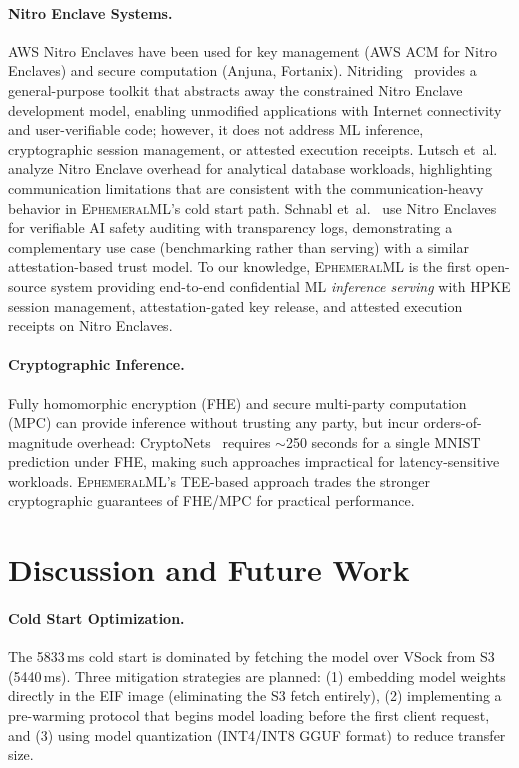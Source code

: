 \documentclass[11pt,a4paper]{article}
\newcommand{\BenchSThreeFetchMs}{5440}
\newcommand{\BenchColdStartTotalMs}{5833}
\begin{document}
\paragraph{Nitro Enclave Systems.}
AWS Nitro Enclaves have been used for key management (AWS ACM for Nitro Enclaves) and secure computation (Anjuna, Fortanix).
Nitriding~\cite{winter2023} provides a general-purpose toolkit that abstracts away the constrained Nitro Enclave development model, enabling unmodified applications with Internet connectivity and user-verifiable code; however, it does not address ML inference, cryptographic session management, or attested execution receipts.
Lutsch et~al.~\cite{lutsch2025} analyze Nitro Enclave overhead for analytical database workloads, highlighting communication limitations that are consistent with the communication-heavy behavior in \textsc{EphemeralML}'s cold start path.
Schnabl et~al.~\cite{schnabl2025} use Nitro Enclaves for verifiable AI safety auditing with transparency logs, demonstrating a complementary use case (benchmarking rather than serving) with a similar attestation-based trust model.
To our knowledge, \textsc{EphemeralML} is the first open-source system providing end-to-end confidential ML \emph{inference serving} with HPKE session management, attestation-gated key release, and attested execution receipts on Nitro Enclaves.

\paragraph{Cryptographic Inference.}
Fully homomorphic encryption (FHE) and secure multi-party computation (MPC) can provide inference without trusting any party, but incur orders-of-magnitude overhead: CryptoNets~\cite{gilad2016} requires $\sim$250 seconds for a single MNIST prediction under FHE, making such approaches impractical for latency-sensitive workloads.
\textsc{EphemeralML}'s TEE-based approach trades the stronger cryptographic guarantees of FHE/MPC for practical performance.

\section{Discussion and Future Work}
\label{sec:discussion}

\paragraph{Cold Start Optimization.}
The \BenchColdStartTotalMs{}\,ms cold start is dominated by fetching the model over VSock from S3 (\BenchSThreeFetchMs{}\,ms).
Three mitigation strategies are planned:
(1) embedding model weights directly in the EIF image (eliminating the S3 fetch entirely),
(2) implementing a pre-warming protocol that begins model loading before the first client request, and
(3) using model quantization (INT4/INT8 GGUF format) to reduce transfer size.
\end{document}
